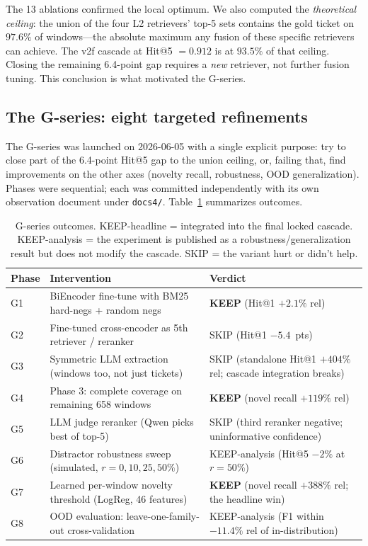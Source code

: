 The 13 ablations confirmed the local optimum. We also computed the \emph{theoretical ceiling}: the union of the four L2 retrievers' top-5 sets contains the gold ticket on $97.6\%$ of windows---the absolute maximum any fusion of these specific retrievers can achieve. The v2f cascade at Hit@5 $= 0.912$ is at $93.5\%$ of that ceiling. Closing the remaining 6.4-point gap requires a \emph{new} retriever, not further fusion tuning. This conclusion is what motivated the G-series.

\subsection{The G-series: eight targeted refinements}

The G-series was launched on 2026-06-05 with a single explicit purpose: try to close part of the 6.4-point Hit@5 gap to the union ceiling, or, failing that, find improvements on the other axes (novelty recall, robustness, OOD generalization). Phases were sequential; each was committed independently with its own observation document under \texttt{docs4/}. Table~\ref{tab:g-summary} summarizes outcomes.

\begin{table}[h]
\centering
\caption{G-series outcomes. KEEP-headline = integrated into the final locked cascade. KEEP-analysis = the experiment is published as a robustness/generalization result but does not modify the cascade. SKIP = the variant hurt or didn't help.}
\label{tab:g-summary}
\small
\begin{tabularx}{\linewidth}{l X l}
\toprule
Phase & Intervention & Verdict \\
\midrule
G1 & BiEncoder fine-tune with BM25 hard-negs + random negs & \textbf{KEEP} (Hit@1 $+2.1\%$ rel) \\
G2 & Fine-tuned cross-encoder as 5th retriever / reranker & SKIP (Hit@1 $-5.4$~pts) \\
G3 & Symmetric LLM extraction (windows too, not just tickets) & SKIP (standalone Hit@1 $+404\%$ rel; cascade integration breaks) \\
G4 & \agent{} Phase 3: complete coverage on remaining 658 windows & \textbf{KEEP} (novel recall $+119\%$ rel) \\
G5 & LLM judge reranker (Qwen picks best of top-5) & SKIP (third reranker negative; uninformative confidence) \\
G6 & Distractor robustness sweep (simulated, $r = 0, 10, 25, 50\%$) & KEEP-analysis (Hit@5 $-2\%$ at $r=50\%$) \\
G7 & Learned per-window novelty threshold (LogReg, 46 features) & \textbf{KEEP} (novel recall $+388\%$ rel; the headline win) \\
G8 & OOD evaluation: leave-one-family-out cross-validation & KEEP-analysis (F1 within $-11.4\%$ rel of in-distribution) \\
\bottomrule
\end{tabularx}
\end{table}

